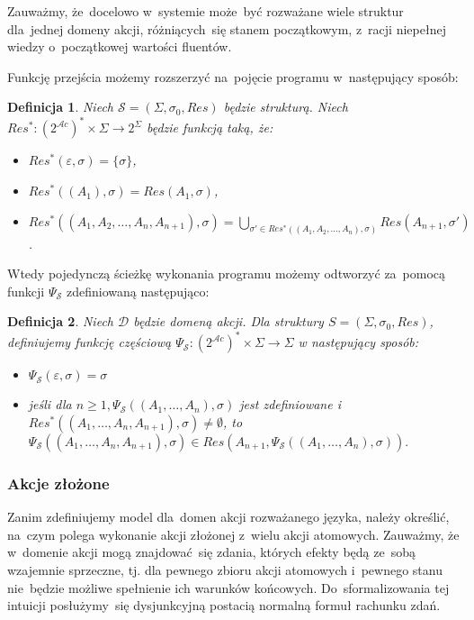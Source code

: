 \documentclass[11pt,a4paper]{article}
\newtheorem{defn}{Definicja}
\begin{document}
Zauważmy, że~docelowo w~systemie może~być rozważane wiele struktur dla~jednej domeny akcji, różniących~się stanem początkowym, z~racji niepełnej wiedzy o~początkowej wartości fluentów.

Funkcję przejścia możemy rozszerzyć na~pojęcie programu w~następujący sposób:

\begin{defn}
    \label{defn:res-star}
    Niech $\mathcal{S} = (\Sigma, \sigma_0, Res)$ będzie strukturą.
    Niech $Res^* : (2^{\mathcal{A}c})^* \times \Sigma \to 2^\Sigma$ będzie funkcją taką, że:
    \begin{itemize}
        \item $Res^*(\varepsilon, \sigma) = \{ \sigma \}$,
        \item $Res^*((A_1), \sigma) = Res(A_1, \sigma)$,
        \item $Res^*((A_1,A_2,\dots,A_n,A_{n+1}), \sigma) = \bigcup_{\sigma' \in Res^*((A_1,A_2,\dots,A_n), \sigma)} Res(A_{n+1}, \sigma')$.
    \end{itemize}
\end{defn}

Wtedy pojedynczą ścieżkę wykonania programu możemy odtworzyć za~pomocą funkcji $\Psi_{\mathcal{S}}$ zdefiniowaną następująco:

\begin{defn}
    \label{defn:psi}
    Niech $\mathcal{D}$ będzie domeną akcji. Dla struktury $S = (\Sigma,\sigma_0,Res)$, definiujemy funkcję częściową 
    $\Psi_{\mathcal{S}} : (2^{\mathcal{A}c})^* \times \Sigma \rightarrow \Sigma$ w następujący sposób:
    \begin{itemize}
    \item $\Psi_{\mathcal{S}}(\varepsilon,\sigma) = \sigma$
    \item jeśli dla $n \geq 1, \Psi_{\mathcal{S}}((A_1,\dots,A_n),\sigma)$ jest zdefiniowane i $Res^*((A_1,\dots,A_n,A_{n+1}),\sigma) \neq \emptyset$, to~$\Psi_{\mathcal{S}}((A_1,\dots,A_n,A_{n+1}),\sigma) \in Res(A_{n+1},\Psi_{\mathcal{S}}((A_1,\dots,A_n),\sigma)).$
    \end{itemize}
\end{defn}

\subsubsection{Akcje złożone}

Zanim zdefiniujemy model dla~domen akcji rozważanego języka, należy określić, na~czym polega wykonanie akcji złożonej z~wielu akcji atomowych.
Zauważmy, że w~domenie akcji mogą znajdować~się zdania, których efekty będą ze~sobą wzajemnie sprzeczne, tj. dla pewnego zbioru akcji atomowych i~pewnego stanu nie~będzie możliwe spełnienie ich warunków końcowych.
Do~sformalizowania tej intuicji posłużymy~się dysjunkcyjną postacią normalną formuł rachunku zdań.
\end{document}
